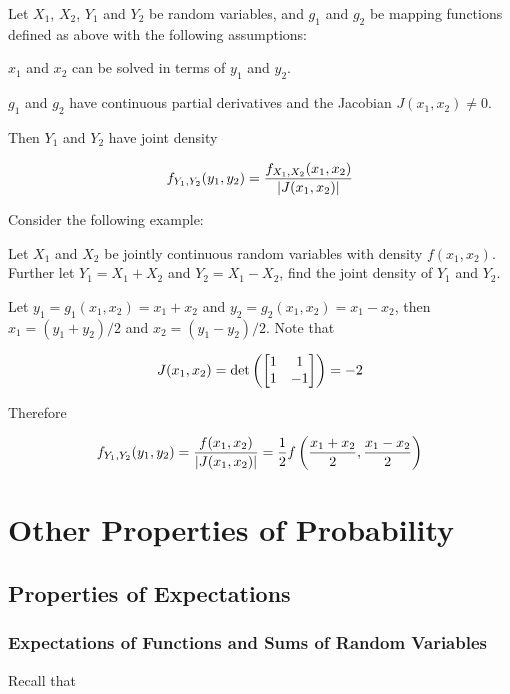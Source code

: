 \documentclass[a4paper,12pt]{article}
\begin{document}
\begin{thm}
  Let $X_{1}$, $X_{2}$, $Y_{1}$ and $Y_{2}$ be random variables, and $g_{1}$ and $g_{2}$ be mapping functions defined as above with the following assumptions:

  \begin{alist}
    \item $x_{1}$ and $x_{2}$ can be solved in terms of $y_{1}$ and $y_{2}$.
    \item $g_{1}$ and $g_{2}$ have continuous partial derivatives and the Jacobian $J(x_{1},x_{2})\neq 0$.
  \end{alist}

  Then $Y_{1}$ and $Y_{2}$ have joint density

  $$f_{Y_{1},Y_{2}}(y_{1},y_{2})=\frac{f_{X_{1},X_{2}}(x_{1},x_{2})}{\left| J(x_{1},x_{2})\right|}$$
\end{thm}\n

Consider the following example:\n

\begin{exm}
  Let $X_{1}$ and $X_{2}$ be jointly continuous random variables with density $f(x_{1},x_{2})$. Further let $Y_{1}=X_{1}+X_{2}$ and $Y_{2}=X_{1}-X_{2}$, find the joint density of $Y_{1}$ and $Y_{2}$.\n

  \ans Let $y_{1}=g_{1}(x_{1},x_{2})=x_{1}+x_{2}$ and $y_{2}=g_{2}(x_{1},x_{2})=x_{1}-x_{2}$, then $x_{1}=(y_{1}+y_{2})/2$ and $x_{2}=(y_{1}-y_{2})/2$. Note that
  
  $$J(x_{1},x_{2})=\det\left( \begin{bmatrix}
    1 & 1\\
    1 & -1
  \end{bmatrix}\right)=-2$$\s

  Therefore

  $$f_{Y_{1},Y_{2}}(y_{1},y_{2})=\frac{f(x_{1},x_{2})}{\left| J(x_{1},x_{2})\right|}=\frac{1}{2}f\left( \frac{x_{1}+x_{2}}{2},\frac{x_{1}-x_{2}}{2}\right)$$
\end{exm}

\pagebreak

\section{Other Properties of Probability}
\subsection{Properties of Expectations}
\subsubsection{Expectations of Functions and Sums of Random Variables}
Recall that
\end{document}
